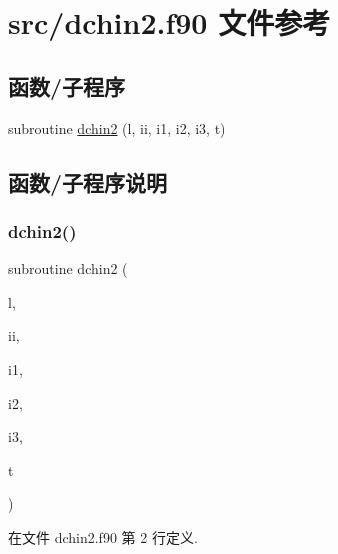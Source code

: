 \hypertarget{dchin2_8f90}{}\section{src/dchin2.f90 文件参考}
\label{dchin2_8f90}
\subsection*{函数/子程序}
\begin{DoxyCompactItemize}
\item 
subroutine \mbox{\hyperlink{dchin2_8f90_ad968e709dbcabfedc92fda7f55c43606}{dchin2}} (l, ii, i1, i2, i3, t)
\end{DoxyCompactItemize}


\subsection{函数/子程序说明}
\mbox{\label{dchin2_8f90_ad968e709dbcabfedc92fda7f55c43606}} 
\subsubsection{\texorpdfstring{dchin2()}{dchin2()}}
{\footnotesize\ttfamily subroutine dchin2 (\begin{DoxyParamCaption}\item[{}]{l,  }\item[{}]{ii,  }\item[{}]{i1,  }\item[{}]{i2,  }\item[{}]{i3,  }\item[{}]{t }\end{DoxyParamCaption})}



在文件 dchin2.\+f90 第 2 行定义.

